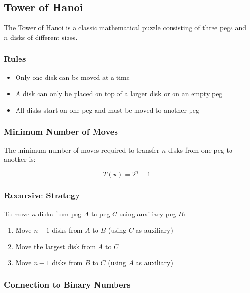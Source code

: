 \subsection{Tower of Hanoi}

The Tower of Hanoi is a classic mathematical puzzle consisting of three pegs and $n$ disks of different sizes.

\subsubsection{Rules}

\begin{itemize}
    \item Only one disk can be moved at a time
    \item A disk can only be placed on top of a larger disk or on an empty peg
    \item All disks start on one peg and must be moved to another peg
\end{itemize}

\subsubsection{Minimum Number of Moves}

The minimum number of moves required to transfer $n$ disks from one peg to another is:

\begin{equation}
    T(n) = 2^n - 1
\end{equation}

\subsubsection{Recursive Strategy}

To move $n$ disks from peg $A$ to peg $C$ using auxiliary peg $B$:

\begin{enumerate}
    \item Move $n-1$ disks from $A$ to $B$ (using $C$ as auxiliary)
    \item Move the largest disk from $A$ to $C$
    \item Move $n-1$ disks from $B$ to $C$ (using $A$ as auxiliary)
\end{enumerate}

\subsubsection{Connection to Binary Numbers}

